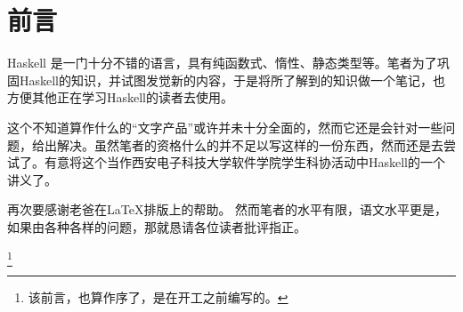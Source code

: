 \newpage


\chapter*{前言}
Haskell 是一门十分不错的语言，具有纯函数式、惰性、静态类型等。笔者为了巩固Haskell的知识，并试图发觉新的内容，于是将所了解到的知识做一个笔记，也方便其他正在学习Haskell的读者去使用。

这个不知道算作什么的“文字产品”或许并未十分全面的，然而它还是会针对一些问题，给出解决。虽然笔者的资格什么的并不足以写这样的一份东西，然而还是去尝试了。有意将这个当作西安电子科技大学软件学院学生科协活动中Haskell的一个讲义了。

再次要感谢老爸在\LaTeX 排版上的帮助。
然而笔者的水平有限，语文水平更是，如果由各种各样的问题，那就恳请各位读者批评指正。

\footnote{该前言，也算作序了，是在开工之前编写的。}
\endinput 